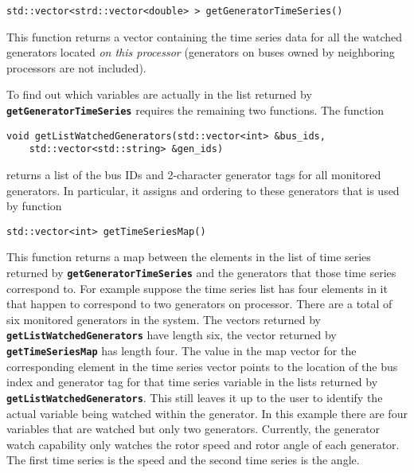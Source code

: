 {
\color{red}
\begin{Verbatim}[fontseries=b]
std::vector<strd::vector<double> > getGeneratorTimeSeries()
\end{Verbatim}
}

This function returns a vector containing the time series data for all the watched generators located \textit{on this processor} (generators on buses owned by neighboring processors are not included).

To find out which variables are actually in the list returned by \texttt{\textbf{getGeneratorTimeSeries}} requires the remaining two functions. The function

{
\color{red}
\begin{Verbatim}[fontseries=b]
void getListWatchedGenerators(std::vector<int> &bus_ids,
    std::vector<std::string> &gen_ids)
\end{Verbatim}
}

returns a list of the bus IDs and 2-character generator tags for all monitored generators. In particular, it assigns and ordering to these generators that is used by function

{
\color{red}
\begin{Verbatim}[fontseries=b]
std::vector<int> getTimeSeriesMap()
\end{Verbatim}
}

This function returns a map between the elements in the list of time series returned by \texttt{\textbf{getGeneratorTimeSeries}} and the generators that those time series correspond to. For example suppose the time series list has four elements in it that happen to correspond to two generators on processor. There are a total of six monitored generators in the system. The vectors returned by \texttt{\textbf{getListWatchedGenerators}} have length six, the vector returned by \texttt{\textbf{getTimeSeriesMap}} has length four. The value in the map vector for the corresponding element in the time series vector points to the location of the bus index and generator tag for that time series variable in the lists returned by \texttt{\textbf{getListWatchedGenerators}}. This still leaves it up to the user to identify the actual variable being watched within the generator. In this example there are four variables that are watched but only two generators. Currently, the generator watch capability only watches the rotor speed and rotor angle of each generator. The first time series is the speed and the second time series is the angle.
